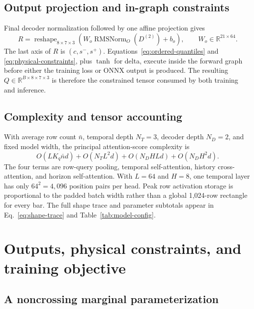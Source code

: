\documentclass[10pt]{article}
\newcommand{\R}{\mathbb{R}}
\newcommand{\RMSNorm}{\operatorname{RMSNorm}}
\begin{document}
\subsection{Output projection and in-graph constraints}

Final decoder normalization followed by one affine projection gives
\begin{equation}
R=\operatorname{reshape}_{8\times7\times3}\!\left(
W_o\RMSNorm_O(D^{(2)})+b_o\right),
\qquad W_o\in\R^{21\times64}.
\label{eq:output-head}
\end{equation}
The last axis of $R$ is $(c,s^-,s^+)$. Equations~\eqref{eq:ordered-quantiles} and
\eqref{eq:physical-constraints}, plus $\tanh$ for delta, execute inside the forward graph before
either the training loss or ONNX output is produced. The resulting $Q\in\R^{B\times8\times7\times3}$
is therefore the constrained tensor consumed by both training and inference.

\subsection{Complexity and tensor accounting}

With average row count $\bar n$, temporal depth $N_T=3$, decoder depth $N_D=2$, and fixed model width,
the principal attention-score complexity is
\begin{equation}
O(LK_q\bar n d)+O(N_TL^2d)+O(N_DHLd)+O(N_DH^2d).
\label{eq:complexity}
\end{equation}
The four terms are row-query pooling, temporal self-attention, history cross-attention, and horizon
self-attention. With $L=64$ and $H=8$, one temporal layer has only $64^2=4{,}096$ position pairs per
head. Peak row activation storage is proportional to the padded batch width rather than a global
1,024-row rectangle for every bar. The full shape trace and parameter subtotals appear in
Eq.~\eqref{eq:shape-trace} and Table~\ref{tab:model-config}.

\section{Outputs, physical constraints, and training objective}

\subsection{A noncrossing marginal parameterization}
\end{document}
